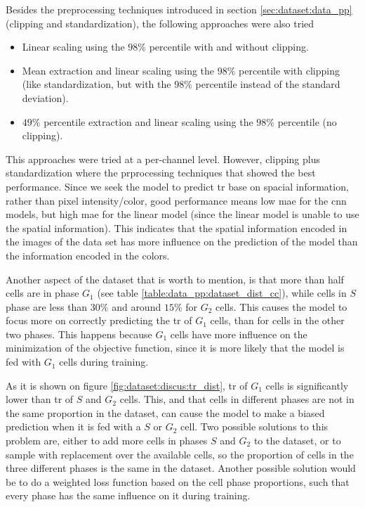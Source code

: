 \glsresetall
\graphicspath{{./Sections/Dataset/Resources/}}

Besides the preprocessing techniques introduced in section \ref{sec:dataset:data_pp} (clipping and standardization), the following approaches were also tried

\begin{itemize}
  \item Linear scaling using the $98\%$ percentile with and without clipping.
  \item Mean extraction and linear scaling using the $98\%$ percentile with clipping (like standardization, but with the $98\%$ percentile instead of the standard deviation).
  \item $49\%$ percentile extraction and linear scaling using the $98\%$ percentile (no clipping).
\end{itemize}

\noindent This approaches were tried at a per-channel level. However, clipping plus standardization where the prprocessing techniques that showed the best performance. Since we seek the model to predict \gls{tr} base on spacial information, rather than pixel intensity/color, good performance means low \gls{mae} for the \gls{cnn} models, but high \gls{mae} for the linear model (since the linear model is unable to use the spatial information). This indicates that the spatial information encoded in the images of the data set has more influence on the prediction of the model than the information encoded in the colors.

Another aspect of the dataset that is worth to mention, is that more than half cells are in phase $G_1$ (see table \ref{table:data_pp:dataset_dist_cc}), while cells in $S$ phase are less than $30\%$ and around $15\%$ for $G_2$ cells. This causes the model to focus more on correctly predicting the \gls{tr} of $G_1$ cells, than for cells in the other two phases. This happens because $G_1$ cells have more influence on the minimization of the objective function, since it is more likely that the model is fed with $G_1$ cells during training.

As it is shown on figure \ref{fig:dataset:discus:tr_dist}, \gls{tr} of $G_1$ cells is significantly lower than \gls{tr} of $S$ and $G_2$ cells. This, and that cells in different phases are not in the same proportion in the dataset, can cause the model to make a biased prediction when it is fed with a $S$ or $G_2$ cell. Two possible solutions to this problem are, either to add more cells in phases $S$ and $G_2$ to the dataset, or to sample with replacement over the available cells, so the proportion of cells in the three different phases is the same in the dataset. Another possible solution would be to do a weighted loss function based on the cell phase proportions, such that every phase has the same influence on it during training.

